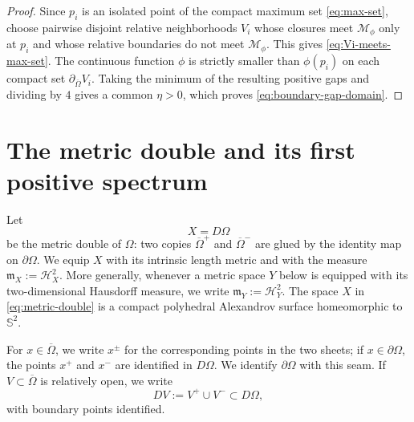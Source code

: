 \documentclass[11pt]{amsart}
\numberwithin{equation}{section}
\newcommand{\HH}{\mathcal H}
\newcommand{\Om}{\Omega}
\newcommand{\mm}{\mathfrak m}
\begin{document}
\begin{proof}
Since $p_i$ is an isolated point of the compact maximum set \eqref{eq:max-set},
choose pairwise disjoint relative neighborhoods $V_i$ whose closures meet
$\mathcal M_\phi$ only at $p_i$ and whose relative boundaries do not meet
$\mathcal M_\phi$.  This gives \eqref{eq:Vi-meets-max-set}.  The continuous
function $\phi$ is strictly smaller than $\phi(p_i)$ on each compact set
$\partial_{\overline\Om}V_i$.  Taking the minimum of the resulting positive gaps
and dividing by $4$ gives a common $\eta>0$, which proves
\eqref{eq:boundary-gap-domain}.
\end{proof}

\section{The metric double and its first positive spectrum}\label{sec:double-spectrum}

Let
\begin{equation}\label{eq:metric-double}
X=D\Om
\end{equation}
be the metric double of $\Om$: two copies $\overline\Om^+$ and
$\overline\Om^-$ are glued by the identity map on $\partial\Om$.  We equip $X$
with its intrinsic length metric and with the measure $\mm_X:=\HH^2_X$.  More
generally, whenever a metric space $Y$ below is equipped with its two-dimensional
Hausdorff measure, we write $\mm_Y:=\HH^2_Y$.  The space $X$ in
\eqref{eq:metric-double} is a compact polyhedral Alexandrov surface homeomorphic
to $\mathbb S^2$.

For $x\in\overline\Om$, we write $x^\pm$ for the corresponding points in the
two sheets; if $x\in\partial\Om$, the points $x^+$ and $x^-$ are identified in
$D\Om$.  We identify $\partial\Om$ with this seam.  If
$V\subset\overline\Om$ is relatively open, we write
$$
DV:=V^+\cup V^-\subset D\Om,
$$
with boundary points identified.
\end{document}
